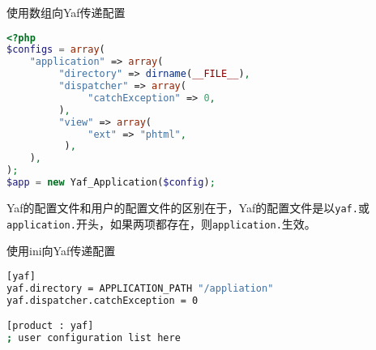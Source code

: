\begin{example}
使用数组向Yaf传递配置
\begin{lstlisting}[language=PHP]
<?php
$configs = array(
    "application" => array(
         "directory" => dirname(__FILE__),
         "dispatcher" => array(
              "catchException" => 0,
         ),
         "view" => array(
              "ext" => "phtml",
          ),
    ),
);
$app = new Yaf_Application($config);
\end{lstlisting}
\end{example}

Yaf的配置文件和用户的配置文件的区别在于，Yaf的配置文件是以\texttt{yaf.}或\texttt{application.}开头，如果两项都存在，则\texttt{application.}生效。

\begin{example}
使用ini向Yaf传递配置
\begin{lstlisting}[language=bash]
[yaf]
yaf.directory = APPLICATION_PATH "/appliation"
yaf.dispatcher.catchException = 0

[product : yaf]
; user configuration list here
\end{lstlisting}
\end{example}


